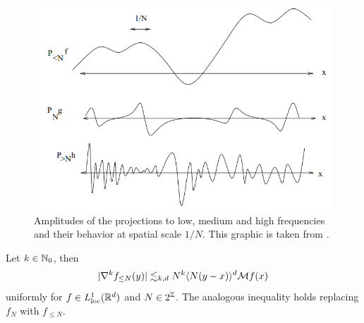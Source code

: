 \begin{figure}[h]
	\begin{center}
		\includegraphics[scale =0.5]{graphics/uncertainty}
		\caption{Amplitudes of the projections to low, medium and high frequencies and their behavior at spatial scale $1/N$. This graphic is taken from \cite[Appendix A]{Tao2006}.}
	\end{center}
\end{figure}




\begin{proposition}
	Let $k \in \mathbb N_0$, then 	
		\[ |\nabla^k f_{\leq N} (y)| \lesssim_{k, d} N^k \langle N(y - x) \rangle^d \mathcal M f (x) \]
	uniformly for $f \in L^1_{\mathrm{loc}} (\mathbb R^d)$ and $N \in 2^\mathbb Z$. The analogous inequality holds replacing $f_N$ with $f_{\leq N}$. 
\end{proposition}

